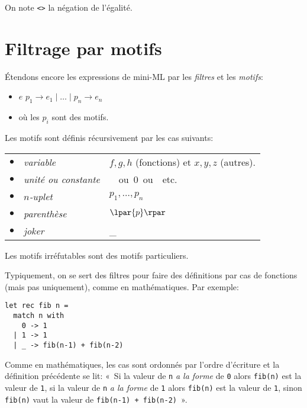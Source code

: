 \bigskip





\bigskip

On note \texttt{<>} la négation de l'égalité.


\section{Filtrage par motifs}

Étendons encore les expressions de mini-ML par les \emph{filtres} et
les \emph{motifs}:
\begin{itemize}
 
  \item \Xmatch{} $e$ \Xwith{} $p_1 \rightarrow e_1 \mid \ldots \mid
    p_n \rightarrow e_n$
 
  \item où les $p_i$ sont des motifs.

\end{itemize}

\bigskip

Les motifs sont définis récursivement par les cas suivants:

\bigskip

\begin{tabular}{rll}
    $\bullet$
  & \emph{variable}
  & $f, g, h$ (fonctions) et $x, y, z$ (autres). \\
    $\bullet$
  & \emph{unité ou constante}
  & \unit \ ou \textsf{0} ou \Xtrue{} etc.\\
    $\bullet$
  & \emph{$n$-uplet}
  & $p_1, \ldots, p_n$\\
    $\bullet$
  & \emph{parenthèse}
  & $\lpar{p}\rpar$\\
    $\bullet$
  & \emph{joker}
  & {\Large \_}
\end{tabular}

\bigskip

\remarque \quad Les motifs irréfutables sont des motifs particuliers.

Typiquement, on se sert des filtres pour faire des définitions par cas
de fonctions (mais pas uniquement), comme en mathématiques. Par exemple:
{\small
\begin{verbatim}
let rec fib n =
  match n with
    0 -> 1
  | 1 -> 1
  | _ -> fib(n-1) + fib(n-2)
\end{verbatim}
} 
Comme en mathématiques, les cas sont ordonnés par l'ordre d'écriture
et la définition précédente se lit: «~Si la valeur de \texttt{n}
\emph{a la forme} de \texttt{0} alors \texttt{fib(n)} est la valeur de
\texttt{1}, si la valeur de \texttt{n} \emph{a la forme} de \texttt{1}
alors \texttt{fib(n)} est la valeur de \texttt{1}, sinon
\texttt{fib(n)} vaut la valeur de \texttt{fib(n-1) + fib(n-2)}~».

